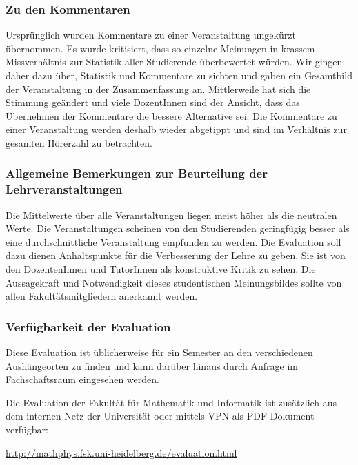 \subsubsection{Zu den Kommentaren}

Ursprünglich wurden Kommentare zu einer Veranstaltung ungekürzt
übernommen. Es wurde kritisiert, dass so einzelne Meinungen in
krassem Missverhältnis zur Statistik aller Studierende überbewertet
würden. Wir gingen daher dazu über, Statistik und Kommentare zu
sichten und gaben ein Gesamtbild der Veranstaltung in der
Zusammenfassung an. Mittlerweile hat sich die Stimmung geändert und
viele DozentInnen sind der Ansicht, dass das Übernehmen der
Kommentare die bessere Alternative sei. Die Kommentare zu einer
Veranstaltung werden deshalb wieder abgetippt und sind im
Verhältnis zur gesamten Hörerzahl zu betrachten.


\subsubsection{Allgemeine Bemerkungen zur Beurteilung der Lehrveranstaltungen}

Die Mittelwerte über alle Veranstaltungen liegen meist höher als die
neutralen Werte. Die Veranstaltungen scheinen von den Studierenden
geringfügig besser als eine durchschnittliche Veranstaltung
empfunden zu werden. Die Evaluation soll dazu dienen Anhaltspunkte
für die Verbesserung der Lehre zu geben. Sie ist von den
DozentenInnen und TutorInnen als konstruktive Kritik zu sehen. Die
Aussagekraft und Notwendigkeit dieses studentischen Meinungsbildes
sollte von allen Fakultätsmitgliedern anerkannt werden.

\subsubsection{Verfügbarkeit der Evaluation}

Diese Evaluation ist üblicherweise für ein Semester an den
verschiedenen Aushängeorten zu finden und kann darüber hinaus durch
Anfrage im Fachschaftsraum eingesehen werden.

Die Evaluation der Fakultät für Mathematik und Informatik ist
zusätzlich aus dem internen Netz der Universität oder mittels VPN
als PDF-Dokument verfügbar:

\url{http://mathphys.fsk.uni-heidelberg.de/evaluation.html}
